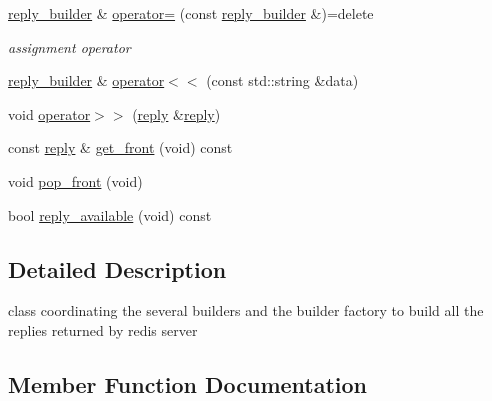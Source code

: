 \begin{DoxyCompactItemize}
\mbox{\label{classcpp__redis_1_1builders_1_1reply__builder_a445ca388e241fe95b522890fee8c14ca}} 
\hyperlink{classcpp__redis_1_1builders_1_1reply__builder}{reply\+\_\+builder} \& \hyperlink{classcpp__redis_1_1builders_1_1reply__builder_a445ca388e241fe95b522890fee8c14ca}{operator=} (const \hyperlink{classcpp__redis_1_1builders_1_1reply__builder}{reply\+\_\+builder} \&)=delete
\begin{DoxyCompactList}\small\item\em assignment operator \end{DoxyCompactList}\item 
\hyperlink{classcpp__redis_1_1builders_1_1reply__builder}{reply\+\_\+builder} \& \hyperlink{classcpp__redis_1_1builders_1_1reply__builder_a5f675e309a7a6002d582293c6410c967}{operator$<$$<$} (const std\+::string \&data)
\item 
void \hyperlink{classcpp__redis_1_1builders_1_1reply__builder_a71c0c93754b0bffb9c84c86ac3096bc4}{operator$>$$>$} (\hyperlink{classcpp__redis_1_1reply}{reply} \&\hyperlink{classcpp__redis_1_1reply}{reply})
\item 
const \hyperlink{classcpp__redis_1_1reply}{reply} \& \hyperlink{classcpp__redis_1_1builders_1_1reply__builder_ac37b532920ace20e24a40ea1c61940fe}{get\+\_\+front} (void) const
\item 
void \hyperlink{classcpp__redis_1_1builders_1_1reply__builder_a0b5fb8dd4fc87c508e0a45647bc86b16}{pop\+\_\+front} (void)
\item 
bool \hyperlink{classcpp__redis_1_1builders_1_1reply__builder_af7d8e764ab591390cd1eae8801cd691c}{reply\+\_\+available} (void) const
\end{DoxyCompactItemize}


\subsection{Detailed Description}
class coordinating the several builders and the builder factory to build all the replies returned by redis server 

\subsection{Member Function Documentation}
\mbox{\label{classcpp__redis_1_1builders_1_1reply__builder_ac37b532920ace20e24a40ea1c61940fe}} 
